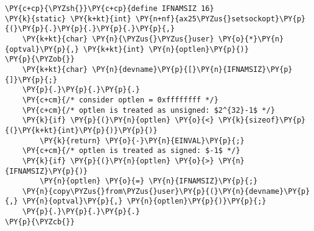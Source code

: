 \begin{Verbatim}[commandchars=\\\{\},codes={\catcode`\$=3\catcode`\^=7\catcode`\_=8}]
\PY{c+cp}{\PYZsh{}}\PY{c+cp}{define IFNAMSIZ 16}
\PY{k}{static} \PY{k+kt}{int} \PY{n+nf}{ax25\PYZus{}setsockopt}\PY{p}{(}\PY{p}{.}\PY{p}{.}\PY{p}{.}\PY{p}{,}
    \PY{k+kt}{char} \PY{n}{\PYZus{}\PYZus{}user} \PY{o}{*}\PY{n}{optval}\PY{p}{,} \PY{k+kt}{int} \PY{n}{optlen}\PY{p}{)}
\PY{p}{\PYZob{}}
    \PY{k+kt}{char} \PY{n}{devname}\PY{p}{[}\PY{n}{IFNAMSIZ}\PY{p}{]}\PY{p}{;}
    \PY{p}{.}\PY{p}{.}\PY{p}{.}
    \PY{c+cm}{/* consider optlen = 0xffffffff */}
    \PY{c+cm}{/* optlen is treated as unsigned: $2^{32}-1$ */}
    \PY{k}{if} \PY{p}{(}\PY{n}{optlen} \PY{o}{<} \PY{k}{sizeof}\PY{p}{(}\PY{k+kt}{int}\PY{p}{)}\PY{p}{)}
        \PY{k}{return} \PY{o}{-}\PY{n}{EINVAL}\PY{p}{;}
    \PY{c+cm}{/* optlen is treated as signed: $-1$ */}
    \PY{k}{if} \PY{p}{(}\PY{n}{optlen} \PY{o}{>} \PY{n}{IFNAMSIZ}\PY{p}{)}
        \PY{n}{optlen} \PY{o}{=} \PY{n}{IFNAMSIZ}\PY{p}{;}
    \PY{n}{copy\PYZus{}from\PYZus{}user}\PY{p}{(}\PY{n}{devname}\PY{p}{,} \PY{n}{optval}\PY{p}{,} \PY{n}{optlen}\PY{p}{)}\PY{p}{;}
    \PY{p}{.}\PY{p}{.}\PY{p}{.}
\PY{p}{\PYZcb{}}
\end{Verbatim}
